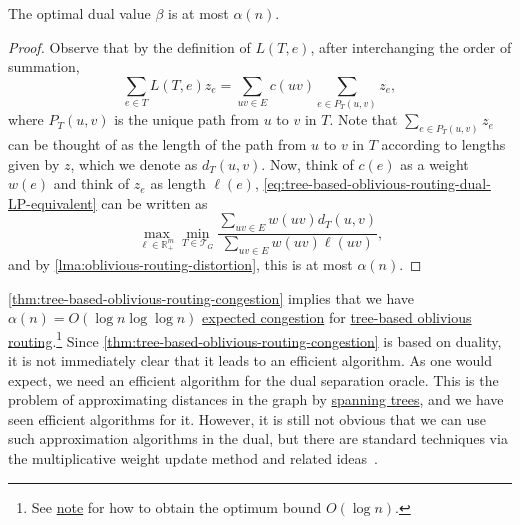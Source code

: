\begin{theorem}\label{thm:tree-based-oblivious-routing-congestion}
	The optimal dual value \(\beta \) is at most \(\alpha (n)\).
\end{theorem}
\begin{proof}
	Observe that by the definition of \(L(T, e)\), after interchanging the order of summation,
	\[
		\sum_{e \in T} L(T, e) z_e
		= \sum_{uv \in E} c(uv) \sum_{e \in P_T(u, v)}  z_e,
	\]
	where \(P_T(u, v)\) is the unique path from \(u\) to \(v\) in \(T\). Note that \(\sum_{e \in P_T(u, v)} z_e\) can be thought of as the length of the path from \(u\) to \(v\) in \(T\) according to lengths given by \(z\), which we denote as \(d_T(u, v)\). Now, think of \(c(e)\) as a weight \(w(e)\) and think of \(z_e\) as length \(\ell (e)\), \autoref{eq:tree-based-oblivious-routing-dual-LP-equivalent} can be written as
	\[
		\max _{\ell \in \mathbb{R} _+^m} \min _{T \in \mathcal{T} _G} \frac{\sum_{uv \in E} w(uv) d_T(u, v)}{\sum_{uv \in E} w(uv) \ell (uv)},
	\]
	and by \autoref{lma:oblivious-routing-distortion}, this is at most \(\alpha (n)\).
\end{proof}

\autoref{thm:tree-based-oblivious-routing-congestion} implies that we have \(\alpha (n) = O(\log n \log \log n)\) \hyperref[def:expected-congestion]{expected congestion} for \hyperref[not:tree-based-oblivious-routing]{tree-based oblivious routing}.\footnote{See \href{https://courses.grainger.illinois.edu/cs598csc/fa2024/Notes/lec-oblivious-routing.pdf}{note} for how to obtain the optimum bound \(O(\log n)\).} Since \autoref{thm:tree-based-oblivious-routing-congestion} is based on duality, it is not immediately clear that it leads to an efficient algorithm. As one would expect, we need an efficient algorithm for the dual separation oracle. This is the problem of approximating distances in the graph by \hyperref[def:spanning-tree]{spanning trees}, and we have seen efficient algorithms for it. However, it is still not obvious that we can use such approximation algorithms in the dual, but there are standard techniques via the multiplicative weight update method and related ideas~\cite{racke2008optimal}.